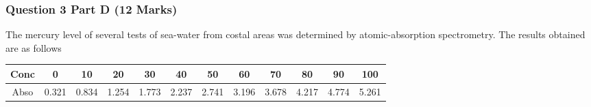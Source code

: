 \documentclass[a4paper,12pt]{article}
\begin{document}
%

%


\subsubsection*{Question 3 Part D (12 Marks)}
The mercury level of several tests of sea-water from costal areas was determined by atomic-absorption spectrometry. The results obtained are as follows
\begin{center}
	\begin{tabular}{|c||c|c|c|c|c|c|c|c|c|c|c|} \hline
		Conc &0 &10&20&30&40&50&60&70&80&90&100 \\ \hline 
		Abso &0.321& 0.834& 1.254& 1.773& 2.237& 2.741& 3.196& 3.678& 
		4.217& 4.774& 5.261 \\ \hline
	\end{tabular} 
	
\end{center}
\end{document}
